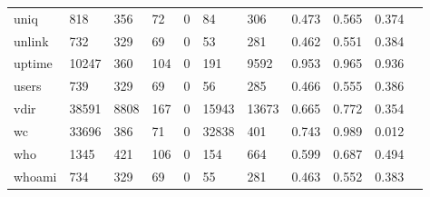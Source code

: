 \begin{longtable}{lp{1.10cm}p{1.10cm}p{1.10cm}p{1.10cm}p{1.10cm}p{1.10cm}p{1.10cm}p{1.10cm}p{1.10cm}p{1.10cm}}
uniq      &                    818 &                                356 &                                72 &                                0 &                                84 &                             306 &                          0.473 &                                 0.565 &                               0.374 \\
unlink    &                    732 &                                329 &                                69 &                                0 &                                53 &                             281 &                          0.462 &                                 0.551 &                               0.384 \\
uptime    &                  10247 &                                360 &                               104 &                                0 &                               191 &                            9592 &                          0.953 &                                 0.965 &                               0.936 \\
users     &                    739 &                                329 &                                69 &                                0 &                                56 &                             285 &                          0.466 &                                 0.555 &                               0.386 \\
vdir      &                  38591 &                               8808 &                               167 &                                0 &                             15943 &                           13673 &                          0.665 &                                 0.772 &                               0.354 \\
wc        &                  33696 &                                386 &                                71 &                                0 &                             32838 &                             401 &                          0.743 &                                 0.989 &                               0.012 \\
who       &                   1345 &                                421 &                               106 &                                0 &                               154 &                             664 &                          0.599 &                                 0.687 &                               0.494 \\
whoami    &                    734 &                                329 &                                69 &                                0 &                                55 &                             281 &                          0.463 &                                 0.552 &                               0.383 \\

\end{longtable}
